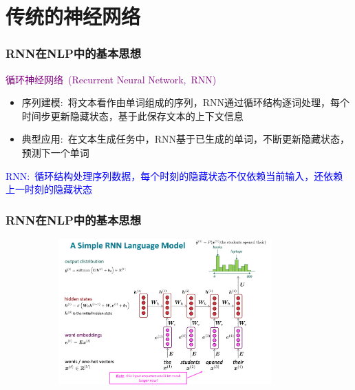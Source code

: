 \small
\section{传统的神经网络}
\begin{frame}
	\frametitle{\textrm{RNN}在\textrm{NLP}中的基本思想}
	\textcolor{purple}{循环神经网络~\textrm{(Recurrent Neural Network,~RNN)}}
    \begin{itemize}
		\setlength{\itemsep}{10pt}
    \item 序列建模:~将文本看作由单词组成的序列，\textrm{RNN}通过循环结构逐词处理，每个时间步更新隐藏状态，基于此保存文本的上下文信息\\
	    {\fontsize{7.2pt}{6.2pt}\selectfont{隐藏状态不仅受当前单词影响，还依赖之前单词的信息，借此模拟人类语言理解过程中的记忆功能}}
    \item 典型应用:~在文本生成任务中，\textrm{RNN}基于已生成的单词，不断更新隐藏状态，预测下一个单词\\
	    {\fontsize{7.2pt}{6.2pt}}
    \end{itemize}
    \textcolor{blue}{\textrm{RNN}:~循环结构处理序列数据，每个时刻的隐藏状态不仅依赖当前输入，还依赖上一时刻的隐藏状态}\\
    \vskip 2pt
    {\fontsize{8.2pt}{6.2pt}}
\end{frame}

\begin{frame}
	\frametitle{\textrm{RNN}在\textrm{NLP}中的基本思想}
\begin{figure}[h!]
\vspace*{-0.05in}
\centering
\includegraphics[height=2.2in, width=4.0in, viewport=0 0 1010 700,clip]{Figures/RNN-Language-model.png}
\label{RNN-language-model}
\end{figure}
\end{frame}

